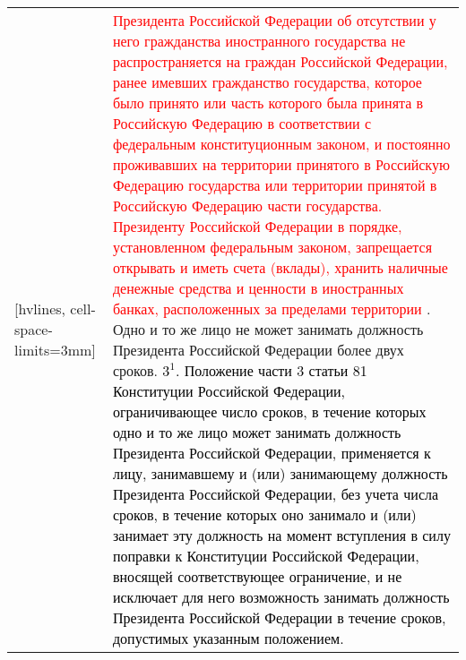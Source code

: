 \documentclass[a4paper,14pt]{extarticle}
\begin{document}
	\pagebreak
	\noindent
	\begin{NiceTabular}{p{92mm}p{91mm}}[hvlines, cell-space-limits=3mm]
		& \textcolor{red}{Президента Российской Федерации об отсутствии у него гражданства иностранного государства не распространяется на граждан Российской Федерации, ранее имевших гражданство государства, которое было принято или часть которого была принята в Российскую Федерацию в соответствии с федеральным конституционным законом, и постоянно проживавших на территории принятого в Российскую Федерацию государства или территории принятой в Российскую Федерацию части государства. Президенту Российской Федерации в порядке, установленном федеральным законом, запрещается открывать и иметь счета (вклады), хранить наличные денежные средства и ценности в иностранных банках, расположенных за пределами территории} . Одно и то же лицо не может занимать
		должность Президента Российской Федерации более
		двух сроков. \newline
		\textcolor{black}{
			$3^1$. Положение части 3 статьи 81 Конституции Российской Федерации, ограничивающее число сроков, в течение которых одно и то же лицо может занимать должность Президента Российской Федерации, применяется к лицу, занимавшему и (или) занимающему должность Президента Российской Федерации, без учета числа сроков, в течение которых оно занимало и (или) занимает эту должность на момент вступления в силу поправки к Конституции Российской Федерации, вносящей соответствующее ограничение, и не исключает для него возможность занимать должность Президента Российской Федерации в течение сроков, допустимых указанным положением.
		} \\
	\end{NiceTabular}
	
\end{document}
